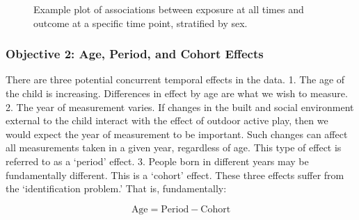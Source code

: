 \documentclass [11pt]{article}
\begin{document}
\begin{figure}[H]
\centering
{}
\caption{Example plot of associations between exposure at all times and outcome at a specific time point, stratified by sex.}
\end{figure}

\subsubsection{Objective 2: Age, Period, and Cohort Effects}
There are three potential concurrent temporal effects in the data. 1. The age of the child is increasing. Differences in effect by age are what we wish to measure. 2. The year of measurement varies. If changes in the built and social environment external to the child interact with the effect of outdoor active play, then we would expect the year of measurement to be important. Such changes can affect all measurements taken in a given year, regardless of age. This type of effect is referred to as a `period' effect. 3. People born in different years may be fundamentally different. This is a `cohort' effect. These three effects suffer from the `identification problem.' That is, fundamentally:

\begin{equation}
\mbox{Age} = \mbox{Period} - \mbox{Cohort} \nonumber
\end{equation}
\end{document}
